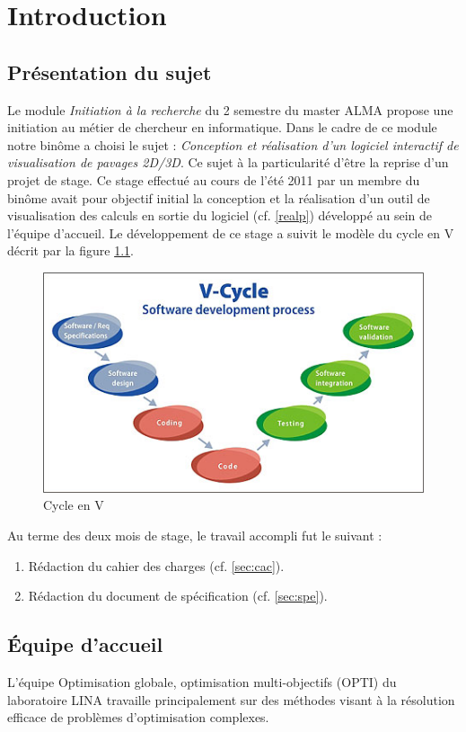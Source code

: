 \chapter{Introduction}

\section{Présentation du sujet}
Le module \emph{Initiation à la recherche} du 2 semestre du master \textsc{ALMA} propose une initiation au métier de chercheur en informatique. Dans le cadre de ce module notre binôme a choisi le sujet : \emph{Conception et réalisation d’un logiciel interactif de visualisation de pavages 2D/3D}. Ce sujet à la particularité d'être la reprise d'un projet de stage. Ce stage effectué au cours de l'été 2011 par un membre du binôme avait pour objectif initial la conception et la réalisation d'un outil de visualisation des calculs en sortie du logiciel  \realpaver (cf. \ref{realp}) développé au sein de l'équipe d'accueil. Le développement de ce stage a suivit le modèle du cycle en V décrit par la figure \ref{fig:vcycle}.
\begin{figure}[htbp]
\centering
\includegraphics[scale=1]{img/vcycle}
\caption{Cycle en V}
\label{fig:vcycle}
\end{figure}
\clearpage
Au terme des deux mois de stage, le travail accompli fut le suivant :
\begin{enumerate}
\item 
Rédaction du cahier des charges (cf. \ref{sec:cac}).
\item
Rédaction du document de spécification (cf. \ref{sec:spe}).
\end{enumerate} 

\section{\'Equipe d'accueil}
L'équipe Optimisation globale, optimisation multi-objectifs\cite{opti} (\textsc{OPTI}) du laboratoire \textsc{LINA}\cite{lina} travaille principalement sur des méthodes visant à la résolution efficace de problèmes d’optimisation complexes.  
